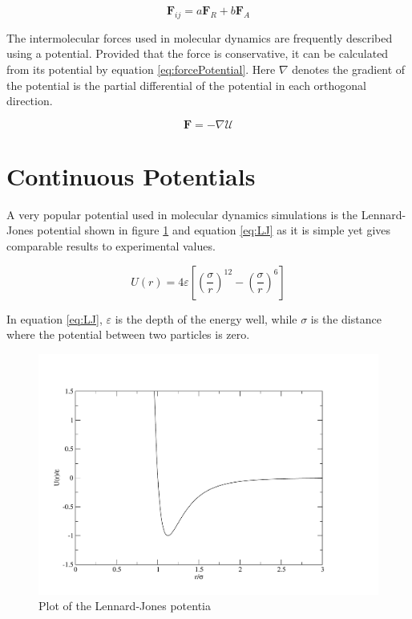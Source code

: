 \message{ !name(main.tex)}\documentclass[12pt]{UoAthesis}
\begin{document}
\begin{equation}
  \mathbf{F}_{ij} = a\mathbf{F}_{R} + b\mathbf{F}_A
  \label{eq:tersoff}
\end{equation}

The intermolecular forces used in molecular dynamics are frequently
described using a potential.  Provided that the force is conservative,
it can be calculated from its potential by equation
\eqref{eq:forcePotential}. Here $\nabla$ denotes the gradient of the
potential is the partial differential of the potential in each
orthogonal direction.

\begin{equation} 
  \mathbf{F}=-\nabla \mathcal{U} 
  \label{eq:forcePotential} 
\end{equation}


\section{Continuous Potentials}


A very popular potential used in molecular dynamics simulations is the
Lennard-Jones potential \cite{Lennard-Jones1924} shown in figure
\ref{fig:ljPot} and equation \eqref{eq:LJ} as it is simple yet gives
comparable results to experimental values.

\begin{equation} 
  U(r) = 4 \varepsilon \left[ \left( \frac{\sigma}{r} \right)^{12}
    -\left( \frac{\sigma}{r} \right)^{6} \right] 
  \label{eq:LJ} 
\end{equation}

In equation \eqref{eq:LJ}, $\varepsilon$ is the depth of the energy
well, while $\sigma$ is the distance where the potential between two
particles is zero.

\begin{figure}[htp] 
  \begin{center}
    \includegraphics[clip,width=\textwidth]{figures/ljPlot} 
    \caption{\label{fig:ljPot} Plot of the Lennard-Jones potentia} 
  \end{center}
\end{figure}
\end{document}
